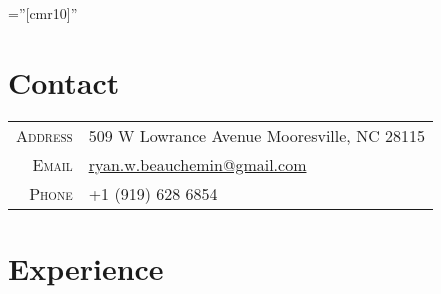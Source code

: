 \documentclass[a4paper,10pt]{article} %
\begin{document}
\pagestyle{empty} %

\font\fb=''[cmr10]'' %

\par{\par\bigskip}

\section{Contact} %

\begin{tabular}{r|l}
\textsc{Address} & 509 W Lowrance Avenue Mooresville, NC 28115 \\
\textsc{Email} & \href{mailto:ryan.w.beauchemin@gmail.com}{ryan.w.beauchemin@gmail.com}\\
\textsc{Phone} & +1 (919) 628 6854\\
\end{tabular}


\section{Experience} %
\end{document}

